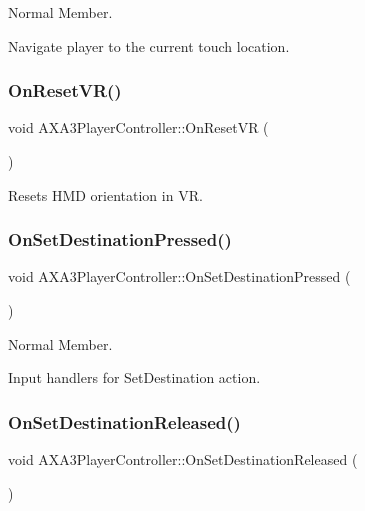 Normal Member. 

Navigate player to the current touch location. \hypertarget{class_a_x_a3_player_controller_a799e0ef8edbdb796c7b5286a7e53bac6}{}\label{class_a_x_a3_player_controller_a799e0ef8edbdb796c7b5286a7e53bac6} 
\subsubsection{\texorpdfstring{On\+Reset\+V\+R()}{OnResetVR()}}
{\footnotesize\ttfamily void A\+X\+A3\+Player\+Controller\+::\+On\+Reset\+VR (\begin{DoxyParamCaption}{ }\end{DoxyParamCaption})\hspace{0.3cm}{\ttfamily [protected]}}

Resets H\+MD orientation in VR. \hypertarget{class_a_x_a3_player_controller_ab559e4393ede764953acd4c868a41eef}{}\label{class_a_x_a3_player_controller_ab559e4393ede764953acd4c868a41eef} 
\subsubsection{\texorpdfstring{On\+Set\+Destination\+Pressed()}{OnSetDestinationPressed()}}
{\footnotesize\ttfamily void A\+X\+A3\+Player\+Controller\+::\+On\+Set\+Destination\+Pressed (\begin{DoxyParamCaption}{ }\end{DoxyParamCaption})}



Normal Member. 

Input handlers for Set\+Destination action. \hypertarget{class_a_x_a3_player_controller_a08d57685ee2b9f7f4d347707113f77c1}{}\label{class_a_x_a3_player_controller_a08d57685ee2b9f7f4d347707113f77c1} 
\subsubsection{\texorpdfstring{On\+Set\+Destination\+Released()}{OnSetDestinationReleased()}}
{\footnotesize\ttfamily void A\+X\+A3\+Player\+Controller\+::\+On\+Set\+Destination\+Released (\begin{DoxyParamCaption}{ }\end{DoxyParamCaption})}



